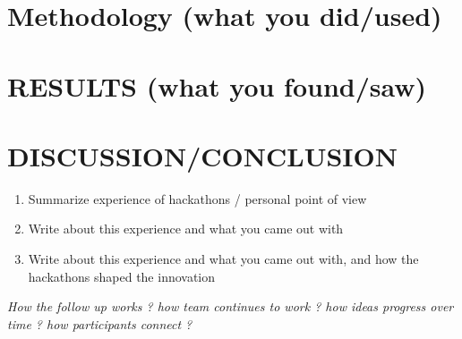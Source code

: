 \section{Methodology (what you did/used)}

\section{RESULTS (what you found/saw)}

\section{DISCUSSION/CONCLUSION}

\renewcommand{\labelenumii}{\Roman{enumii}}
\begin{enumerate}

	\item Summarize experience of hackathons / personal point of view
	\item Write about this experience and what you came out with
		\item Write about this experience and what you came out with, and how the hackathons shaped the innovation

\end{enumerate}
\textit{How the follow up works ? how team continues to work ? how ideas progress over time ? how participants connect ?}


